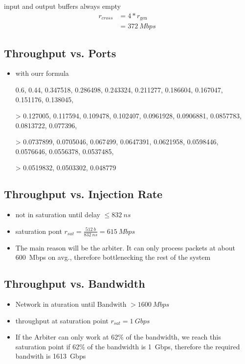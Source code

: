 \documentclass[]{scrartcl}
\begin{document}
\begin{itemize}
            input and output buffers always empty
            \begin{align}
                r_{cross} &= 4*r_\text{gen}\\
                &= \SI{372}{Mbps}
            \end{align}
    \end{itemize}
    \subsection{Throughput vs. Ports}
    \begin{itemize}
        \item with ourr formula
            {0.6, 0.44, 0.347518, 0.286498, 0.243324, 0.211277, 0.186604, 0.167047, 0.151176, 0.138045,

>    0.127005, 0.117594, 0.109478, 0.102407, 0.0961928, 0.0906881, 0.0857783, 0.0813722, 0.077396,

>    0.0737899, 0.0705046, 0.067499, 0.0647391, 0.0621958, 0.0598446, 0.0576646, 0.0556378, 0.0537485,

>    0.0519832, 0.0503302, 0.048779}
    \end{itemize}
    \subsection{Throughput vs. Injection Rate}
    \begin{itemize}
        \item not in saturation until delay $\leq \SI{832}{ns}$
        \item saturation pont $r_{sat} = \frac{\SI{512}{b}}{\SI{832}{ns}} = \SI{615}{Mbps}$
        \item The main reason will be the arbiter. It can only process packets at about \SI{600}{Mbps} on avg., therefore bottlenecking the rest of the system
    \end{itemize}
    \subsection{Throughput vs. Bandwidth}
    \begin{itemize}
        \item Network in aturation until Bandwith $> \SI{1600}{Mbps}$
        \item throughput at saturation point $r_{sat} = \SI{1}{Gbps}$
        \item If the Arbiter can only work at 62\% of the bandwidth, we reach this saturation point if 62\% of the bandwidth is \SI{1}{Gbps}, therefore the required bandwith is \SI{1613}{Gbps}
    \end{itemize}
\end{document}
